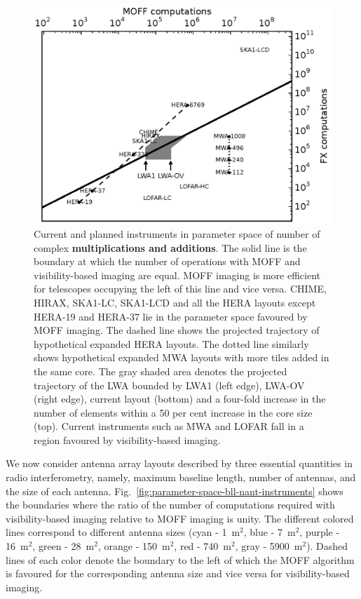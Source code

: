 \documentclass[a4paper,fleqn,usenatbib]{mnras}
\begin{document}
\begin{figure}
  \includegraphics[width=\columnwidth]{figure11}
  \caption{Current and planned instruments in parameter space of
    number of complex {\bf multiplications and additions}. The solid line
    is the boundary at which the number of operations with MOFF and 
    visibility-based imaging are equal. MOFF imaging is more efficient for 
    telescopes occupying the left of this line and vice versa. CHIME, HIRAX, 
    SKA1-LC, SKA1-LCD and all the HERA layouts except HERA-19 and HERA-37 lie 
    in the parameter space favoured by MOFF imaging. The dashed line shows the 
    projected trajectory of hypothetical expanded HERA layouts. The dotted line 
    similarly shows hypothetical expanded MWA layouts with more tiles added in 
    the same core. The gray shaded area denotes the projected trajectory of the 
    LWA bounded by LWA1 (left edge), LWA-OV (right edge), current layout 
    (bottom) and a four-fold increase in the number of elements within a 50 per 
    cent increase in the core size (top). Current instruments such as MWA and 
    LOFAR fall in a region favoured by visibility-based imaging.}
  \label{fig:parameter-space-computations-instruments}
\end{figure}

We now consider antenna array layouts described by three essential quantities in radio interferometry, namely, maximum baseline length, number of antennas, and the size of each antenna. Fig.~\ref{fig:parameter-space-bll-nant-instruments} shows the boundaries where the ratio of the number of computations required with visibility-based imaging relative to MOFF imaging is unity. The different colored lines correspond to different antenna sizes (cyan - 1~m$^2$, blue - 7~m$^2$, purple - 16~m$^2$, green - 28~m$^2$, orange - 150~m$^2$, red - 740~m$^2$, gray - 5900~m$^2$). Dashed lines of each color denote the boundary to the left of which the MOFF algorithm is favoured for the corresponding antenna size and vice versa for visibility-based imaging.
\end{document}
